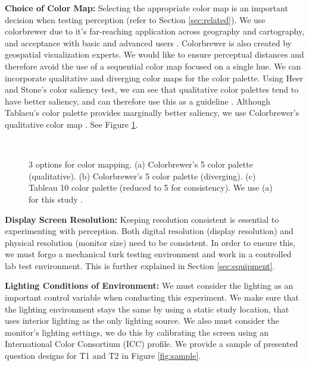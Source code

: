 \textbf{Choice of Color Map: } 
Selecting the appropriate color map is an important decision when testing perception (refer to Section \ref{sec:related}). We use colorbrewer \cite{colorbrewer} due to it's far-reaching application across geography and cartography, and acceptance with basic and advanced users \cite{brewer2003transition}. Colorbrewer is also created by geospatial visualization experts. We would like to ensure perceptual distances and therefore avoid the use of a sequential color map focused on a single hue. We can incorporate qualitative and diverging color maps for the color palette. Using Heer and Stone's color saliency test, we can see that qualitative color palettes tend to have better saliency, and can therefore use this as a guideline \cite{heer2012color}. Although Tablaeu's color palette provides marginally better saliency, we use Colorbrewer's qualitative color map \cite{colorbrewer, tableau}. See Figure \ref{fig:color}.

\begin{figure}[t] \centering
{}~
~
\caption{3 options for color mapping. (a) Colorbrewer's 5 color palette (qualitative). (b) Colorbrewer's 5 color palette (diverging). (c) Tableau 10 color palette (reduced to 5 for consistency). We use (a) for this study \cite{colorbrewer, tableau}.} \label{fig:color}
\end{figure} 


\textbf{Display Screen Resolution: }
Keeping resolution consistent is essential to experimenting with perception. Both digital resolution (display resolution) and physical resolution (monitor size) need to be consistent. In order to ensure this, we must forgo a mechanical turk testing environment and work in a controlled lab test environment. This is further explained in Section \ref{sec:equipment}.

\textbf{Lighting Conditions of Environment:}
We must consider the lighting as an important control variable when conducting this experiment. We make sure that the lighting environment stays the same by using a static study location, that uses interior lighting as the only lighting source. We also must consider the monitor's lighting settings, we do this by calibrating the screen using an International Color Consortium (ICC) profile. We provide a sample of presented question designs for T1 and T2 in Figure \ref{fig:sample}.

